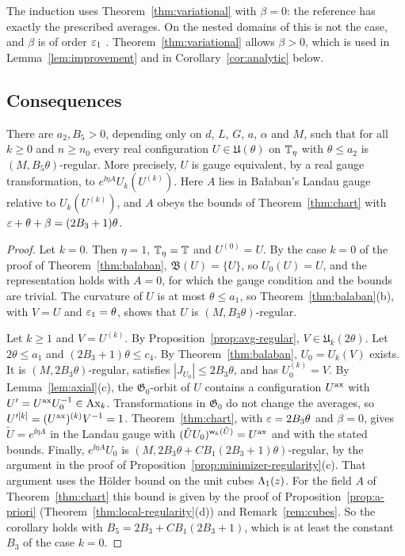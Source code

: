 The induction uses Theorem~\ref{thm:variational} with $\beta=0$: the reference has exactly the prescribed averages. On the nested domains of \cite{BalVar} this is not the case, and $\beta$ is of order $\varepsilon_1$ \cite[(14)]{BalVar}. Theorem~\ref{thm:variational} allows $\beta>0$, which is used in Lemma~\ref{lem:improvement} and in Corollary~\ref{cor:analytic} below.

\subsection{Consequences}

\begin{corollary}\label{cor:regularity}
There are $a_2,B_5>0$, depending only on $d$, $L$, $G$, $a$, $\alpha$ and $M$, such that for all $k\ge0$ and $n\ge n_0$ every real configuration $U\in\mathfrak U(\theta)$ on $\mathbb T_\eta$ with $\theta\le a_2$ is $(M,B_5\theta)$-regular. More precisely, $U$ is gauge equivalent, by a real gauge transformation, to $e^{\ii\eta A}U_k(U^{(k)})$. Here $A$ lies in Ba\l aban's Landau gauge relative to $U_k(U^{(k)})$, and $A$ obeys the bounds of Theorem~\ref{thm:chart} with $\varepsilon+\theta+\beta=(2B_3+1)\theta$.
\end{corollary}

\begin{proof}
Let $k=0$. Then $\eta=1$, $\mathbb T_\eta=\mathbb T$ and $U^{(0)}=U$. By the case $k=0$ of the proof of Theorem~\ref{thm:balaban}, $\mathfrak B(U)=\{U\}$, so $U_0(U)=U$, and the representation holds with $A=0$, for which the gauge condition and the bounds are trivial. The curvature of $U$ is at most $\theta\le a_1$, so Theorem~\ref{thm:balaban}(b), with $V=U$ and $\varepsilon_1=\theta$, shows that $U$ is $(M,B_3\theta)$-regular.

Let $k\ge1$ and $V=U^{(k)}$. By Proposition~\ref{prop:avg-regular}, $V\in\mathfrak U_k(2\theta)$. Let $2\theta\le a_1$ and $(2B_3+1)\theta\le c_4$. By Theorem~\ref{thm:balaban}, $U_0=U_k(V)$ exists. It is $(M,2B_3\theta)$-regular, satisfies $|J_{U_0}|\le2B_3\theta$, and has $U_0^{(k)}=V$. By Lemma~\ref{lem:axial}(c), the $\mathfrak G_0$-orbit of $U$ contains a configuration $U^{\rm ax}$ with $U'=U^{\rm ax}U_0^{-1}\in\mathrm{Ax}_k$. Transformations in $\mathfrak G_0$ do not change the averages, so $U'^{[k]}=(U^{\rm ax})^{(k)}V^{-1}=1$. Theorem~\ref{thm:chart}, with $\varepsilon=2B_3\theta$ and $\beta=0$, gives $\tilde U=e^{\ii\eta A}$ in the Landau gauge with $(\tilde UU_0)^{\mathsf w_k(\tilde U)}=U^{\rm ax}$ and with the stated bounds. Finally, $e^{\ii\eta A}U_0$ is $(M,2B_3\theta+CB_1(2B_3+1)\theta)$-regular, by the argument in the proof of Proposition~\ref{prop:minimizer-regularity}(c). That argument uses the H\"older bound on the unit cubes $\Lambda_1(z)$. For the field $A$ of Theorem~\ref{thm:chart} this bound is given by the proof of Proposition~\ref{prop:a-priori} (Theorem~\ref{thm:local-regularity}(d)) and Remark~\ref{rem:cubes}. So the corollary holds with $B_5=2B_3+CB_1(2B_3+1)$, which is at least the constant $B_3$ of the case $k=0$.
\end{proof}

